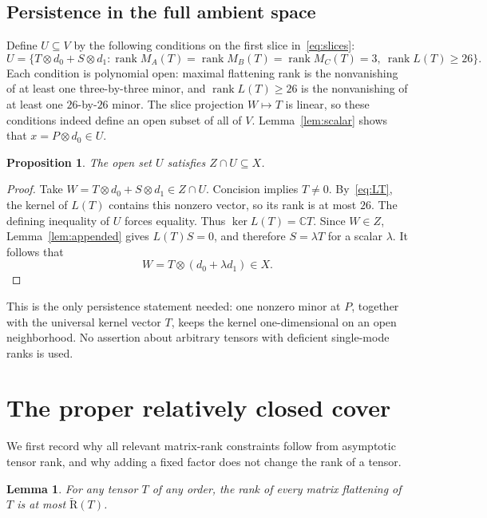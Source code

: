 \documentclass[10pt,a4paper]{article}
\newtheorem{proposition}[theorem]{Proposition}
\newtheorem{lemma}[theorem]{Lemma}
\theoremstyle{definition}
\theoremstyle{remark}
\numberwithin{equation}{section}
\newcommand{\C}{\mathbb C}
\newcommand{\AR}{\widetilde{\mathrm R}}
\DeclareMathOperator{\rank}{rank}
\begin{document}
\subsection{Persistence in the full ambient space}

Define $U\subseteq V$ by the following conditions on the first
slice in~\eqref{eq:slices}:
\begin{equation}\label{eq:U}
 U=\{T\otimes d_0+S\otimes d_1:
       \rank M_A(T)=\rank M_B(T)=\rank M_C(T)=3,
       \ \rank L(T)\geq26\}.
\end{equation}
Each condition is polynomial open: maximal flattening rank is
the nonvanishing of at least one three-by-three minor, and
$\rank L(T)\geq26$ is the nonvanishing of at least one
$26$-by-$26$ minor. The slice projection $W\mapsto T$ is linear,
so these conditions indeed define an open subset of all of $V$.
Lemma~\ref{lem:scalar} shows that $x=P\otimes d_0\in U$.

\begin{proposition}\label{prop:open}
The open set $U$ satisfies $Z\cap U\subseteq X$.
\end{proposition}

\begin{proof}
Take $W=T\otimes d_0+S\otimes d_1\in Z\cap U$.
Concision implies $T\ne0$. By~\eqref{eq:LT}, the kernel of
$L(T)$ contains this nonzero vector, so its rank is at most $26$.
The defining inequality of $U$ forces equality. Thus
$\ker L(T)=\C T$. Since $W\in Z$, Lemma~\ref{lem:appended}
gives $L(T)S=0$, and therefore $S=\lambda T$ for a scalar
$\lambda$. It follows that
\[
 W=T\otimes(d_0+\lambda d_1)\in X.
\]
\end{proof}

This is the only persistence statement needed: one nonzero minor
at $P$, together with the universal kernel vector $T$, keeps the
kernel one-dimensional on an open neighborhood. No assertion
about arbitrary tensors with deficient single-mode ranks is used.

\section{The proper relatively closed cover}\label{sec:cover}

We first record why all relevant matrix-rank constraints follow
from asymptotic tensor rank, and why adding a fixed factor does
not change the rank of a tensor.

\begin{lemma}\label{lem:flatten}
For any tensor $T$ of any order, the rank of every matrix
flattening of $T$ is at most $\AR(T)$.
\end{lemma}
\end{document}
